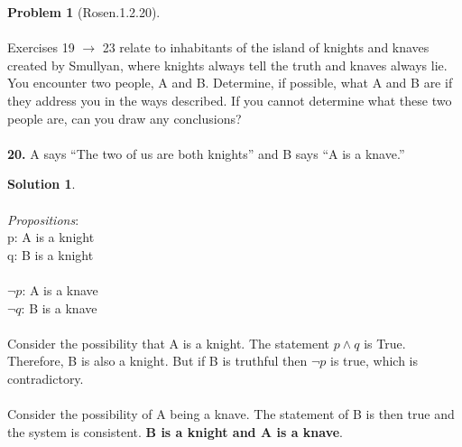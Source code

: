 \documentclass{article}
\theoremstyle{definition}
\newtheorem*{problem}{Problem}
\newtheorem*{solution}{Solution}
\begin{document}
\begin{problem}[Rosen.1.2.20]\ \\
\ \\
Exercises 19 $\rightarrow$ 23 relate to inhabitants of the island of knights
and knaves created by Smullyan, where knights always tell
the truth and knaves always lie. You encounter two people,
A and B. Determine, if possible, what A and B are if they
address you in the ways described. If you cannot determine
what these two people are, can you draw any conclusions?\ \\
\ \\
\textbf{20.} A says “The two of us are both knights” and B says “A is a knave.”\ \\
\begin{compactenum}
\renewcommand{\theenumi}{\alph{enumi}}

\end{compactenum}
\end{problem}

\begin{solution}\ \\
\ \\
\textit{Propositions}:\ \\
p: A is a knight\ \\
q: B is a knight\ \\
\ \\
$\neg p$: A is a knave\ \\
$\neg q$: B is a knave\ \\
\ \\
Consider the possibility that A is a knight. The statement $p \wedge q$ is True. Therefore, B is also a knight. But if B is truthful then $\neg p$ is true, which is contradictory.\ \\
\ \\
Consider the possibility of A being a knave. The statement of B is then true and the system is consistent. \textbf{B is a knight and A is a knave}.
\begin{compactenum}
\renewcommand{\theenumi}{\alph{enumi}}


\end{compactenum}
\end{solution}
\end{document}

